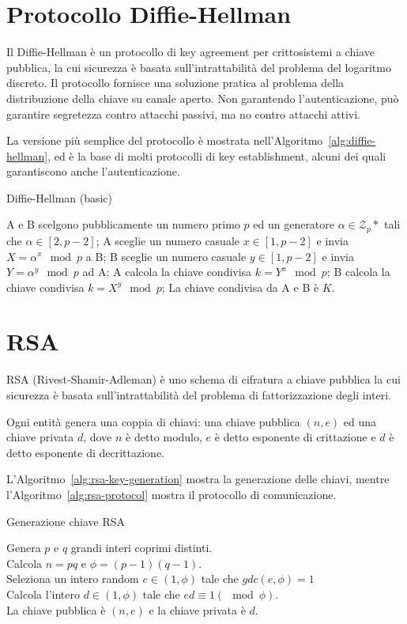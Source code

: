 \section{Protocollo Diffie-Hellman}
Il Diffie-Hellman è un protocollo di key agreement per crittosistemi a chiave pubblica, la cui sicurezza è basata sull'intrattabilità del problema del logaritmo discreto.
Il protocollo fornisce una soluzione pratica al problema della distribuzione della chiave su canale aperto.
Non garantendo l'autenticazione, può garantire segretezza contro attacchi passivi, ma no contro attacchi attivi.

La versione più semplice del protocollo è mostrata nell'Algoritmo~\ref{alg:diffie-hellman}, ed è la base di molti protocolli di key establishment, alcuni dei quali garantiscono anche l'autenticazione.

\bigskip
\begin{algorithm}[H]
  \caption{Diffie-Hellman (basic)}
  \label{alg:diffie-hellman}
  \SetAlgoNoLine
  A e B scelgono pubblicamente un numero primo $p$ ed un generatore $\alpha\in\mathcal{Z}_{p}*$ tali che $\alpha\in[2,p-2]$;
  A sceglie un numero casuale $x\in[1,p-2]$ e invia $X=\alpha^{x}\mod p$ a B;
  B sceglie un numero casuale $y\in[1,p-2]$ e invia $Y=\alpha^{y}\mod p$ ad A;
  A calcola la chiave condivisa $k=Y^{x} \mod p$;
  B calcola la chiave condivisa $k=X^{y} \mod p$;
  La chiave condivisa da A e B è $K$.
\end{algorithm}


\section{RSA}
RSA (Rivest-Shamir-Adleman) è uno schema di cifratura a chiave pubblica la cui sicurezza è basata sull'intrattabilità del problema di fattorizzazione degli interi.

Ogni entità genera una coppia di chiavi: una chiave pubblica $(n,e)$ ed una chiave privata $d$, dove $n$ è detto modulo, $e$ è detto esponente di crittazione e $d$ è detto esponente di decrittazione.

L'Algoritmo~\ref{alg:rsa-key-generation} mostra la generazione delle chiavi, mentre l'Algoritmo~\ref{alg:rsa-protocol} mostra il protocollo di comunicazione.

\bigskip
\begin{algorithm}[H]
  \caption{Generazione chiave RSA}
  \label{alg:rsa-key-generation}
  \SetAlgoNoLine
  Genera $p$ e $q$ grandi interi coprimi distinti.\\
  Calcola $n=pq$ e $\phi=(p-1)(q-1)$.\\
  Seleziona un intero random $e \in (1,\phi)$ tale che $gdc(e,\phi)=1$\\
  Calcola l'intero $d \in (1,\phi)$ tale che $ed\equiv 1 (\mod \phi)$.\\
  La chiave pubblica è $(n,e)$ e la chiave privata è $d$.\\
\end{algorithm}

